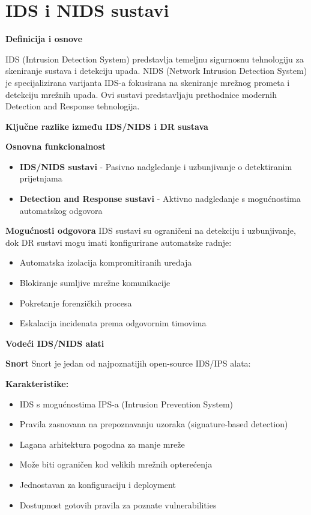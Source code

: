 \chapter{IDS i NIDS sustavi}

\textbf{Definicija i osnove}

IDS (Intrusion Detection System) predstavlja temeljnu sigurnosnu tehnologiju za skeniranje sustava i detekciju upada. NIDS (Network Intrusion Detection System) je specijalizirana varijanta IDS-a fokusirana na skeniranje mrežnog prometa i detekciju mrežnih upada. Ovi sustavi predstavljaju prethodnice modernih Detection and Response tehnologija.

\textbf{Ključne razlike između IDS/NIDS i DR sustava}

\textbf{Osnovna funkcionalnost}
\begin{itemize}
\item \textbf{IDS/NIDS sustavi} - Pasivno nadgledanje i uzbunjivanje o detektiranim prijetnjama
\item \textbf{Detection and Response sustavi} - Aktivno nadgledanje s mogućnostima automatskog odgovora
\end{itemize}

\textbf{Mogućnosti odgovora}
IDS sustavi su ograničeni na detekciju i uzbunjivanje, dok DR sustavi mogu imati konfigurirane automatske radnje:
\begin{itemize}
\item Automatska izolacija kompromitiranih uređaja
\item Blokiranje sumljive mrežne komunikacije
\item Pokretanje forenzičkih procesa
\item Eskalacija incidenata prema odgovornim timovima
\end{itemize}

\textbf{Vodeći IDS/NIDS alati}

\textbf{Snort}
Snort je jedan od najpoznatijih open-source IDS/IPS alata:

\textbf{Karakteristike:}
\begin{itemize}
\item IDS s mogućnostima IPS-a (Intrusion Prevention System)
\item Pravila zasnovana na prepoznavanju uzoraka (signature-based detection)
\item Lagana arhitektura pogodna za manje mreže
\item Može biti ograničen kod velikih mrežnih opterećenja
\item Jednostavan za konfiguraciju i deployment
\item Dostupnost gotovih pravila za poznate vulnerabilities
\end{itemize}

